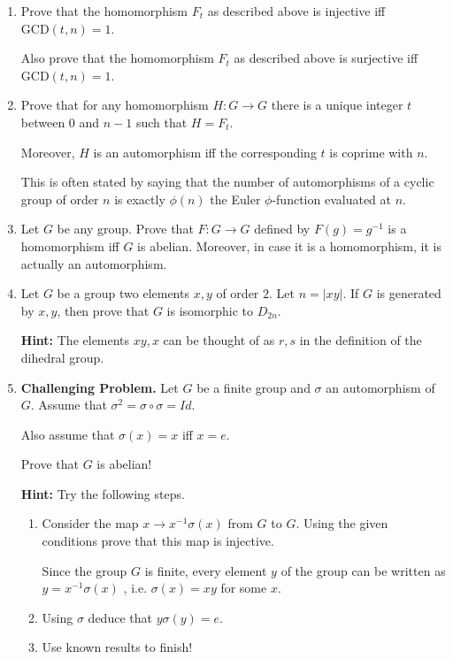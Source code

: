\documentclass[12pt]{article}
\begin{document}
\begin{enumerate}
\item Prove that the homomorphism $F_t$ as described above is injective iff
$\mbox{GCD}(t,n)=1$.

Also prove that the homomorphism $F_t$ as described above is surjective iff
$\mbox{GCD}(t,n)=1$.

\item Prove that for any homomorphism $H:G\rightarrow G$ there is a
unique integer $t$ between $0$ and $n-1$ such that $H=F_t$.

Moreover, $H$ is an automorphism iff the corresponding $t$ is coprime
with $n$.

This is often stated by saying that the number of automorphisms of a
cyclic group of order $n$ is exactly $\phi(n)$ the Euler $\phi$-function
evaluated at $n$.

\item Let $G$ be any group. Prove that $F:G \rightarrow G$ defined by
$F(g)=g^{-1}$ is a
homomorphism iff $G$ is abelian. Moreover, in case it is a homomorphism,
it is actually an automorphism.

\item Let $G$ be a group two  elements $x,y$ of order $2$.
Let $n=|xy|$. If $G$ is generated by $x,y$, then prove that $G$ is isomorphic to $D_{2n}$.

{\bf Hint:} The elements $xy,x$ can be thought of as $r,s$ in the
definition of the dihedral group.

\item {\bf Challenging Problem.}
Let $G$ be a finite group and $\sigma$ an automorphism of $G$.
Assume that $\sigma^2 = \sigma \circ \sigma = Id$.

Also assume that $\sigma(x)=x$ iff $x=e$.

Prove that $G$ is abelian!

{\bf Hint:}
Try the following steps.
\begin{enumerate}
\item Consider the map $x\rightarrow x^{-1}\sigma(x)$ from $G$ to $G$.
Using the given conditions prove that this map is injective.

Since the group $G$ is finite, every  element $y$ of the group can be
written as $y=x^{-1}\sigma(x)$ , i.e. $\sigma(x)=xy$ for some $x$.

\item Using $\sigma$ deduce that $y\sigma(y)=e$.
\item Use known results to finish!


\end{enumerate}

\end{enumerate}
\end{document}

